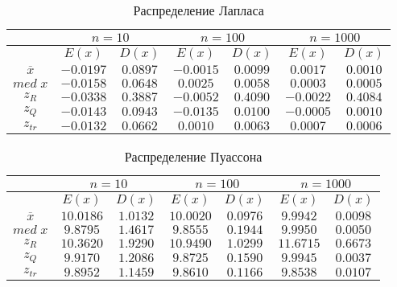 \documentclass[12pt,a4paper]{article}
\begin{document}
\begin{center}
		\begin{table}[h!]
			\caption{Распределение Лапласа}
			\begin{center}
				\begin{tabular}{|c|c|c|c|c|c|c|}
					\hline
					& \multicolumn{2}{c|}{$n=10$} & \multicolumn{2}{c|}{$n=100$} & \multicolumn{2}{c|}{$n=1000$}\\
					\hline
					& $E(x)$ & $D(x)$ & $E(x)$ & $D(x)$ & $E(x)$ & $D(x)$\\
					\hline
					$\overline{x}$ & $-0.0197$ & $0.0897$ & $-0.0015$ & $0.0099$ & $0.0017$ & $0.0010$\\
					\hline
					$med\;x$ & $-0.0158$ & $0.0648$ & $0.0025$ & $0.0058$ & $0.0003$ & $0.0005$\\
					\hline
					$z_R$ & $-0.0338$ & $0.3887$ & $-0.0052$ & $0.4090$ & $-0.0022$ & $0.4084$\\
					\hline
					$z_Q$ & $-0.0143$ & $0.0943$ & $-0.0135$ & $0.0100$ & $-0.0005$ & $0.0010$\\
					\hline
					$z_{tr}$ & $-0.0132$ & $0.0662$ & $0.0010$ & $0.0063$ & $0.0007$ & $0.0006$\\
					\hline
				\end{tabular}
			\end{center}
		\end{table}
	
		\begin{table}[h]
			\caption{Распределение Пуассона}
			\begin{center}
				\begin{tabular}{|c|c|c|c|c|c|c|}
					\hline
					& \multicolumn{2}{c|}{$n=10$} & \multicolumn{2}{c|}{$n=100$} & \multicolumn{2}{c|}{$n=1000$}\\
					\hline
					& $E(x)$ & $D(x)$ & $E(x)$ & $D(x)$ & $E(x)$ & $D(x)$\\
					\hline
					$\overline{x}$ & $10.0186$ & $1.0132$ & $10.0020$ & $0.0976$ & $9.9942$ & $0.0098$\\
					\hline
					$med\;x$ & $9.8795$ & $1.4617$ & $9.8555$ & $0.1944$ & $9.9950$ & $0.0050$\\
					\hline
					$z_R$ & $10.3620$ & $1.9290$ & $10.9490$ & $1.0299$ & $11.6715$ & $0.6673$\\
					\hline
					$z_Q$ & $9.9170$ & $1.2086$ & $9.8725$ & $0.1590$ & $9.9945$ & $0.0037$\\
					\hline
					$z_{tr}$ & $9.8952$ & $1.1459$ & $9.8610$ & $0.1166$ & $9.8538$ & $0.0107$\\
					\hline
				\end{tabular}
			\end{center}
		\end{table}
	

\end{center}
\end{document}
